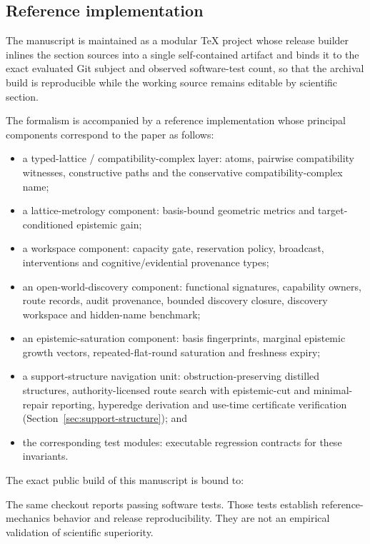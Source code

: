 \subsection{Reference implementation}

The manuscript is maintained as a modular \TeX{} project whose release builder inlines the section sources into a single self-contained artifact and binds it to the exact evaluated Git subject and observed software-test count, so that the archival build is reproducible while the working source remains editable by scientific section.

The formalism is accompanied by a reference implementation whose principal components correspond to the paper as follows:

\begin{itemize}[leftmargin=*]
\item a typed-lattice / compatibility-complex layer: atoms, pairwise compatibility witnesses, constructive paths and the conservative compatibility-complex name;
\item a lattice-metrology component: basis-bound geometric metrics and target-conditioned epistemic gain;
\item a workspace component: capacity gate, reservation policy, broadcast, interventions and cognitive/evidential provenance types;
\item an open-world-discovery component: functional signatures, capability owners, route records, audit provenance, bounded discovery closure, discovery workspace and hidden-name benchmark;
\item an epistemic-saturation component: basis fingerprints, marginal epistemic growth vectors, repeated-flat-round saturation and freshness expiry;
\item a support-structure navigation unit: obstruction-preserving distilled structures, authority-licensed route search with epistemic-cut and minimal-repair reporting, hyperedge derivation and use-time certificate verification (Section~\ref{sec:support-structure}); and
\item the corresponding test modules: executable regression contracts for these invariants.
\end{itemize}

The exact public build of this manuscript is bound to:

\begin{center}
\ImplementationSHA
\end{center}

The same checkout reports \SoftwareTests{} passing software tests. Those tests establish reference-mechanics behavior and release reproducibility. They are not an empirical validation of scientific superiority.

